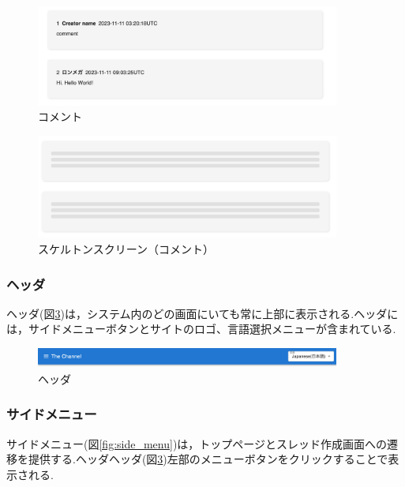 \documentclass[b5paper,12pt,dvipdfmx]{jsreport}
\begin{document}
\begin{figure}[H]
	\centering
    \includegraphics[width=100mm,height=33.24mm]{./img/feature/comment.png}
	\caption{コメント}
	\label{fig:comment}
\end{figure}

\begin{figure}[H]
	\centering
    \includegraphics[width=100mm,height=34.30mm]{./img/feature/comment_skeleton.png}
	\caption{スケルトンスクリーン（コメント）}
	\label{fig:comment_skeleton}
\end{figure}


\subsubsection{ヘッダ}
ヘッダ(図\ref{fig:header})は，システム内のどの画面にいても常に上部に表示される.ヘッダには，サイドメニューボタンとサイトのロゴ、言語選択メニューが含まれている.

\begin{figure}[H]
	\centering
    \includegraphics[width=100mm,height=6.66mm]{./img/feature/header.png}
	\caption{ヘッダ}
	\label{fig:header}
\end{figure}


\subsubsection{サイドメニュー}
サイドメニュー(図\ref{fig:side_menu})は，トップページとスレッド作成画面への遷移を提供する.ヘッダヘッダ(図\ref{fig:header})左部のメニューボタンをクリックすることで表示される.
\end{document}
